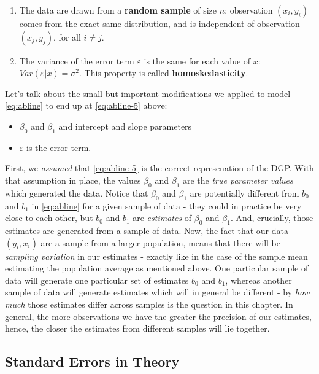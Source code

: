 \documentclass[]{book}
\providecommand{\tightlist}{%
  \setlength{\itemsep}{0pt}\setlength{\parskip}{0pt}}
\theoremstyle{definition}
\theoremstyle{definition}
\theoremstyle{definition}
\theoremstyle{remark}
\begin{document}
\begin{enumerate}
\def\labelenumi{\arabic{enumi}.}
\setcounter{enumi}{2}
\tightlist
\item
  The data are drawn from a \textbf{random sample} of size \(n\):
  observation \((x_i,y_i)\) comes from the exact same distribution, and
  is independent of observation \((x_j,y_j)\), for all \(i\neq j\).
\item
  The variance of the error term \(\varepsilon\) is the same for each
  value of \(x\): \(Var(\varepsilon|x) = \sigma^2\). This property is
  called \textbf{homoskedasticity}.
\end{enumerate}

Let's talk about the small but important modifications we applied to
model \eqref{eq:abline} to end up at \eqref{eq:abline-5} above:

\begin{itemize}
\tightlist
\item
  \(\beta_0\) and \(\beta_1\) and intercept and slope parameters
\item
  \(\varepsilon\) is the error term.
\end{itemize}

First, we \emph{assumed} that \eqref{eq:abline-5} is the correct
represenation of the DGP. With that assumption in place, the values
\(\beta_0\) and \(\beta_1\) are the \emph{true parameter values} which
generated the data. Notice that \(\beta_0\) and \(\beta_1\) are
potentially different from \(b_0\) and \(b_1\) in \eqref{eq:abline} for a
given sample of data - they could in practice be very close to each
other, but \(b_0\) and \(b_1\) are \emph{estimates} of \(\beta_0\) and
\(\beta_1\). And, crucially, those estimates are generated from a sample
of data. Now, the fact that our data \((y_i,x_i)\) are a sample from a
larger population, means that there will be \emph{sampling variation} in
our estimates - exactly like in the case of the sample mean estimating
the population average as mentioned above. One particular sample of data
will generate one particular set of estimates \(b_0\) and \(b_1\),
whereas another sample of data will generate estimates which will in
general be different - by \emph{how much} those estimates differ across
samples is the question in this chapter. In general, the more
observations we have the greater the precision of our estimates, hence,
the closer the estimates from different samples will lie together.

\subsection{Standard Errors in Theory}\label{standard-errors-in-theory}
\end{document}
